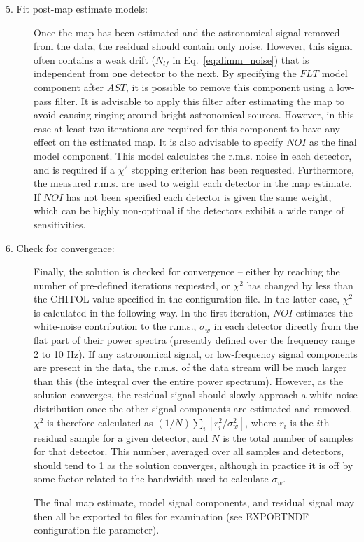 \documentclass[twoside,11pt]{article}
\renewcommand{\_}{\texttt{\symbol{95}}}
\begin{document}
\begin{description}
\item[5. Fit post-map estimate models:] Once the map has been
  estimated and the astronomical signal removed from the data, the
  residual should contain only noise. However, this signal often
  contains a weak drift ($N_{lf}$ in Eq.~\ref{eq:dimm_noise}) that is
  independent from one detector to the next. By specifying the $FLT$
  model component after $AST$, it is possible to remove this component
  using a low-pass filter. It is advisable to apply this filter after
  estimating the map to avoid causing ringing around bright
  astronomical sources. However, in this case at least two iterations
  are required for this component to have any effect on the estimated
  map. It is also advisable to specify $NOI$ as the final model
  component. This model calculates the r.m.s. noise in each detector,
  and is required if a $\chi^2$ stopping criterion has been
  requested. Furthermore, the measured r.m.s. are used to weight each
  detector in the map estimate. If $NOI$ has not been specified each
  detector is given the same weight, which can be highly non-optimal
  if the detectors exhibit a wide range of sensitivities.

\item[6. Check for convergence:] Finally, the solution is checked for
  convergence -- either by reaching the number of pre-defined
  iterations requested, or $\chi^2$ has changed by less than the
  CHITOL value specified in the configuration file. In the latter
  case, $\chi^2$ is calculated in the following way. In the first
  iteration, $NOI$ estimates the white-noise contribution to the
  r.m.s., $\sigma_w$ in each detector directly from the flat part of
  their power spectra (presently defined over the frequency range 2 to
  10 Hz). If any astronomical signal, or low-frequency signal
  components are present in the data, the r.m.s. of the data stream
  will be much larger than this (the integral over the entire power
  spectrum). However, as the solution converges, the residual signal
  should slowly approach a white noise distribution once the other
  signal components are estimated and removed. $\chi^2$ is therefore
  calculated as $(1/N) \sum_i[ r_i^2/\sigma^2_w]$, where $r_i$ is the
  $i$th residual sample for a given detector, and $N$ is the total
  number of samples for that detector. This number, averaged over all
  samples and detectors, should tend to 1 as the solution converges,
  although in practice it is off by some factor related to the
  bandwidth used to calculate $\sigma_w$.

  The final map estimate, model signal components, and residual signal
  may then all be exported to files for examination (see EXPORTNDF
  configuration file parameter).

\end{description}
\end{document}
